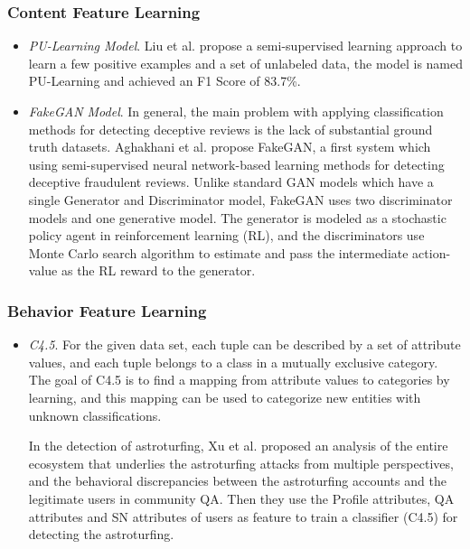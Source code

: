 \documentclass[lettersize,journal]{IEEEtran}
\begin{document}
\subsubsection{Content Feature Learning}
\begin{itemize}
\item \emph{PU-Learning Model}.
Liu et al.\cite{Liu2003Building} propose a semi-supervised learning approach to learn a few positive examples and a set of unlabeled data, the model is named PU-Learning and achieved an F1 Score of 83.7\%.
 
\item \emph{FakeGAN Model}.
In general, the main problem with applying classification methods for detecting deceptive reviews is the lack of substantial ground truth datasets. Aghakhani et al.\cite{aghakhani2018detecting} propose FakeGAN, a first system which using semi-supervised neural network-based learning methods for detecting deceptive fraudulent reviews. Unlike standard GAN models which have a single Generator and Discriminator model, FakeGAN uses two discriminator models and one generative model. The generator is modeled as a stochastic policy agent in reinforcement learning (RL), and the discriminators use Monte Carlo search algorithm to estimate and pass the intermediate action-value as the RL reward to the generator.
\end{itemize}


\subsubsection{Behavior Feature Learning}
\begin{itemize}
\item \emph{C{4.5}}.
For the given data set, each tuple can be described by a set of attribute values, and each tuple belongs to a class in a mutually exclusive category. The goal of C4.5 is to find a mapping from attribute values to categories by learning, and this mapping can be used to categorize new entities with unknown classifications.

In the detection of astroturfing, Xu et al.\cite{Xu2015RevealingCA} proposed an analysis of the entire ecosystem that underlies the astroturfing attacks from multiple perspectives, and the behavioral discrepancies between the astroturfing accounts and the legitimate users in community QA. Then they use the Profile attributes, QA attributes and SN attributes of users as feature to train a classifier (C4.5) for detecting the astroturfing.

  \end{itemize}
\end{document}
